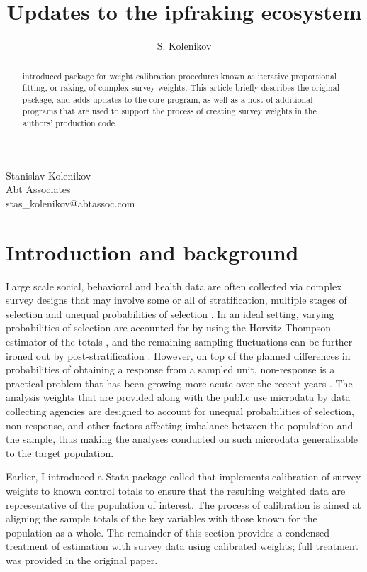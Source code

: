 \author{S. Kolenikov}{%
  Stanislav Kolenikov\\Abt Associates\\stas\_kolenikov@abtassoc.com
}
\title[Raking survey data: updates]{Updates to the ipfraking ecosystem}
\maketitle

\begin{abstract}
\citet{kolenikov:2014} introduced package 
for weight calibration procedures known as iterative proportional fitting,
or raking, of complex survey weights.
This article briefly describes the original package,
and adds updates to the core program, as well as a host of
additional programs that are used to support the process of creating
survey weights in the authors' production code.

\end{abstract}

\section{Introduction and background}

Large scale social, behavioral and health data are often collected
via complex survey designs that may involve some or all of stratification,
multiple stages of selection and unequal probabilities of selection
\citep{korn:graubard:1995,korn:graubard:1999}.
In an ideal setting, varying probabilities of selection are
accounted for by using the Horvitz-Thompson estimator of the totals
\citep{horvitz:thompson:1952,thompson:1997}, and the remaining
sampling fluctuations can be further ironed out by
post-stratification \citep{holt:smith:1979}.
However, on top of the planned differences in probabilities of obtaining
a response from a sampled unit, non-response is a practical problem
that has been growing more acute over the recent years
\citep{groves:dillman:eltinge:little:2001,pew:2012}.
The analysis weights that are provided along with the public use
microdata by data collecting agencies are designed to account
for unequal probabilities of selection, non-response, and other factors
affecting imbalance between the population and the sample, thus making
the analyses conducted on such microdata generalizable to the target population.

Earlier, I introduced \citep{kolenikov:2014} a Stata package
called  that implements
calibration of survey weights to known control totals to ensure
that the resulting weighted data are representative of the population
of interest. The process of calibration is aimed at aligning the sample totals
of the key variables with those known for the population as a whole.
The remainder of this section provides a condensed treatment of estimation
with survey data using calibrated weights; full treatment was provided
in the original paper.

